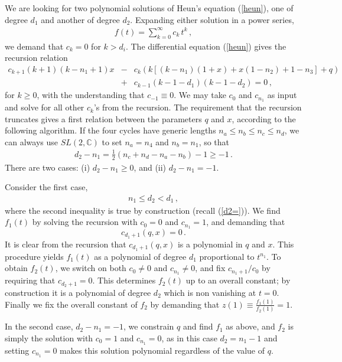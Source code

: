 \documentclass[letterpaper]{JHEP3}
\def\half{{\frac12}}
\def\be{\begin{equation}}
\def\ee{\end{equation}}
\def\be{\begin{eqnarray}}
\def\ee{\end{eqnarray}}
\begin{document}
We are looking for two polynomial solutions of Heun's equation  (\ref{heun}), one of degree $d_1$ and another of degree $d_2$. Expanding either solution
in a power series,
\be
f(t)=\sum_{k=0}^\infty c_k\,t^k \, ,
\ee we demand that  $c_k=0$ for $k>d_i$. The differential equation (\ref{heun}) gives the recursion relation
\be\label{recurs}
c_{k+1}(k+1)(k-n_1+1)x&-&c_{k}(k\left[(k-n_1)(1+x)+x(1-n_2)+1-n_3\right]+q) \\&+&c_{k-1}(k-1-d_1)(k-1-d_2)=0\, ,\nonumber
\ee 
for $ k \geq 0$, with the understanding that $c_{-1} \equiv 0$. We may take $c_0$ and
 $c_{n_1}$  as input and solve for all other $c_k$'s from the recursion. The requirement that the recursion truncates
gives a first relation between the  parameters $q$ and $x$, according to the following algorithm. 
If the four cycles have generic lengths $n_a\leq n_b\leq n_c\leq n_d$, we can always use  $SL(2,\mathbb{C})$ to set
$n_a = n_4$ and $n_b = n_1$,  so that
\be
d_2-n_1=\half\left(n_c+n_d-n_a-n_b\right)-1\geq -1 \, .
\ee
There are  two  cases: (i)  $d_2-n_1\geq 0$, and (ii) $d_2 - n_1 = -1$.

Consider the first case,
\be \label{condpol}n_1\leq d_2<d_1\,  ,\ee
where the second inequality is true by construction (recall  (\ref{d2=})).
We find $f_1(t)$ by solving the recursion with
 $c_0=0$ and $c_{n_1}=1$, and demanding that 
 \begin{equation} \label{1rel}
 c_{d_1+1}(q, x) = 0 \, . 
 \end{equation}
  It is clear from the recursion that $c_{d_1 +1}(q,x)$
 is a polynomial in $q$ and $x$. This procedure yields $f_1(t)$
 as a polynomial of degree $d_1$  proportional to $t^{n_1}$.
To obtain $f_2(t)$, we switch on 
both $c_0  \neq 0$ and $c_{n_1}\neq0$, and fix
$c_{n_1 +1}/c_0$ 
by requiring that $c_{d_2+1}=0$. This determines $f_2(t)$ up to an overall constant; 
by construction it is  a polynomial of degree
$d_2$ which is non vanishing at $t=0$. Finally we fix the overall 
constant of $f_2$ by demanding that  $z(1) \equiv \frac{f_1(1)}{f_2(1)} =1$. 

In the second case,  $d_2-n_1=-1$,
 we constrain $q$ and find $f_1$ as above, and $f_2$ is simply the solution with $c_0=1$ and $c_{n_1}=0$,
as in this case $d_2=n_1-1$ and setting $c_{n_1}=0$ makes this solution polynomial regardless of the value of $q$.
\end{document}
